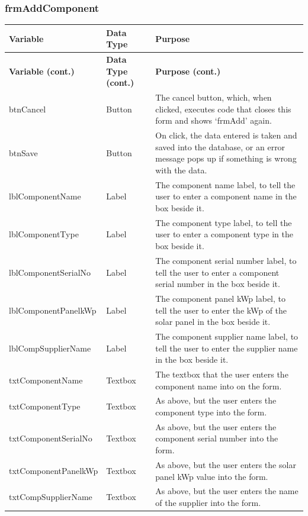 	\subsubsection{frmAddComponent}
	\begin{longtable}{| p{4cm} | p{3cm} | p{10cm} |}
		\hline
		\textbf{Variable} & \textbf{Data Type} & \textbf{Purpose}\\
		\endfirsthead
		\hline
		\textbf{Variable (cont.)} & \textbf{Data Type (cont.)} & \textbf{Purpose (cont.)}\\
		\endhead
		\hline
		btnCancel & Button & The cancel button, which, when clicked, executes code that closes this form and shows `frmAdd' again.\\
		\hline
		btnSave & Button & On click, the data entered is taken and saved into the database, or an error message pops up if something is wrong with the data.\\
		\hline
		lblComponentName & Label & The component name label, to tell the user to enter a component name in the box beside it.\\
		\hline
		lblComponentType & Label & The component type label, to tell the user to enter a component type in the box beside it.\\
		\hline
		lblComponentSerialNo & Label & The component serial number label, to tell the user to enter a component serial number in the box beside it.\\
		\hline
		lblComponentPanelkWp & Label & The component panel kWp label, to tell the user to enter the kWp of the solar panel in the box beside it.\\
		\hline
		lblCompSupplierName & Label & The component supplier name label, to tell the user to enter the supplier name in the box beside it.\\
		\hline
		txtComponentName & Textbox & The textbox that the user enters the component name into on the form.\\
		\hline
		txtComponentType & Textbox & As above, but the user enters the component type into the form.\\
		\hline
		txtComponentSerialNo & Textbox & As above, but the user enters the component serial number into the form.\\
		\hline
		txtComponentPanelkWp & Textbox & As above, but the user enters the solar panel kWp value into the form.\\
		\hline
		txtCompSupplierName & Textbox & As above, but the user enters the name of the supplier into the form.\\

\end{longtable}
